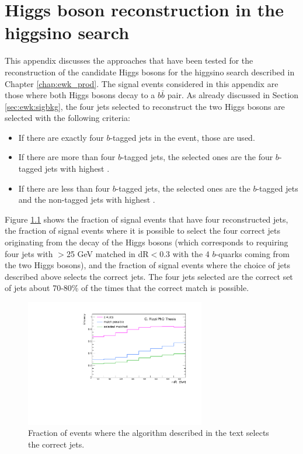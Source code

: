 \chapter{Higgs boson reconstruction in the higgsino search}
\label{app:higgs}

This appendix discusses the approaches that have been tested for the reconstruction of the 
candidate Higgs bosons for the higgsino search described in Chapter \ref{chap:ewk_prod}. 
The signal events considered in this appendix are those where both Higgs bosons decay to a $b\bar{b}$ pair. 
As already discussed in Section \ref{sec:ewk:sigbkg}, the four jets selected to reconstruct the two Higgs bosons 
are selected with the following criteria:

\begin{itemize}
\item If there are exactly four $b$-tagged jets in the event, those are used.
\item If there are more than four $b$-tagged jets, the selected ones are the four $b$-tagged jets with highest \pt.
\item If there are less than four $b$-tagged jets, the selected ones are the $b$-tagged jets and the non-tagged jets with highest \pt.
\end{itemize}

Figure  \ref{fig:h_reco_match_possible}  shows the fraction of signal events that have four reconstructed jets, the fraction 
of signal events where it is possible to select the four correct jets originating from the decay of the Higgs bosons 
(which corresponds to requiring four jets with \pt $>$25 GeV  matched in dR$<$0.3 with the 4 $b$-quarks coming from the two Higgs bosons), 
and the fraction of signal events where the choice of jets described above selects the correct jets. 
The four jets selected are the correct set of jets about 70-80\% of the times that the correct match is possible. 


\begin{figure}[h]
\centering
\includegraphics[width=0.7\textwidth]{figures/h_reco/match_possible.pdf}
\caption{Fraction of events where the algorithm described in the text selects the correct jets.}
\label{fig:h_reco_match_possible}
\end{figure}

